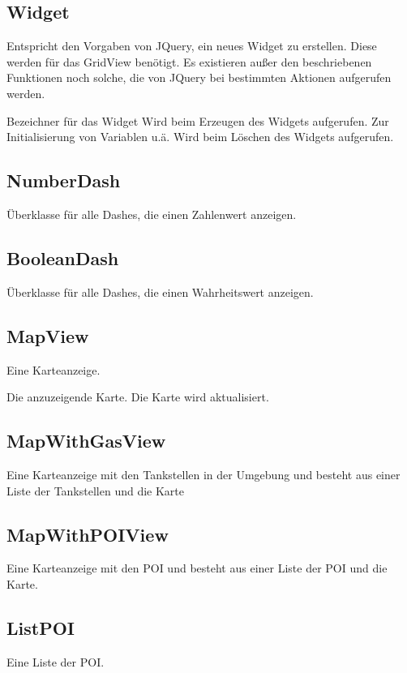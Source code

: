 \documentclass[entwurf.tex]{subfiles}
\begin{document}
		\subsection{Widget}
		\label{Class:Widget}
		Entspricht den Vorgaben von JQuery, ein neues Widget zu erstellen. Diese werden für das GridView benötigt. Es existieren außer den beschriebenen Funktionen noch solche, die von JQuery bei bestimmten Aktionen aufgerufen werden.
		\begin{description}
				Bezeichner für das Widget 
				Wird beim Erzeugen des Widgets aufgerufen. Zur Initialisierung von Variablen u.ä.
				Wird beim Löschen des Widgets aufgerufen.
		\end{description}
		
		\subsection{NumberDash}
		\label{Class:NumberDash}
			Überklasse für alle Dashes, die einen Zahlenwert anzeigen.
		
		\subsection{BooleanDash}
		\label{Class:BooleanDash}
			Überklasse für alle Dashes, die einen Wahrheitswert anzeigen.
			
		\subsection{MapView}
			Eine Karteanzeige.
			\begin{description}
			\attr{map: Map}
			Die anzuzeigende Karte.
			\method{updateMap()}
			Die Karte wird aktualisiert.
			\end{description}
		\subsection{MapWithGasView}
			Eine Karteanzeige mit den Tankstellen in der Umgebung und besteht aus einer
			Liste der Tankstellen und die Karte
		\subsection{MapWithPOIView}
			Eine Karteanzeige mit den POI und besteht aus einer Liste der POI und die
			Karte.
		\subsection{ListPOI}
			Eine Liste der POI.
\end{document}
